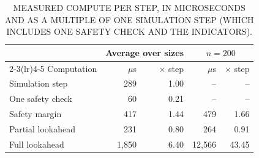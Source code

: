 \begin{table}[t]
\centering
\footnotesize
\caption{MEASURED COMPUTE PER STEP, IN MICROSECONDS AND AS A MULTIPLE OF ONE SIMULATION STEP (WHICH INCLUDES ONE SAFETY CHECK AND THE INDICATORS).}
\label{tab:cost}
\begin{tabular}{lrrrr}
\toprule
 & \multicolumn{2}{c}{Average over sizes} & \multicolumn{2}{c}{$n=200$} \\
\cmidrule(lr){2-3}\cmidrule(lr){4-5}
Computation & $\mu$s & $\times$ step & $\mu$s & $\times$ step \\
\midrule
Simulation step & 289 & 1.00 & -- & -- \\
One safety check & 60 & 0.21 & -- & -- \\
Safety margin & 417 & 1.44 & 479 & 1.66 \\
Partial lookahead & 231 & 0.80 & 264 & 0.91 \\
Full lookahead & 1{,}850 & 6.40 & 12{,}566 & 43.45 \\
\bottomrule
\end{tabular}
\end{table}
